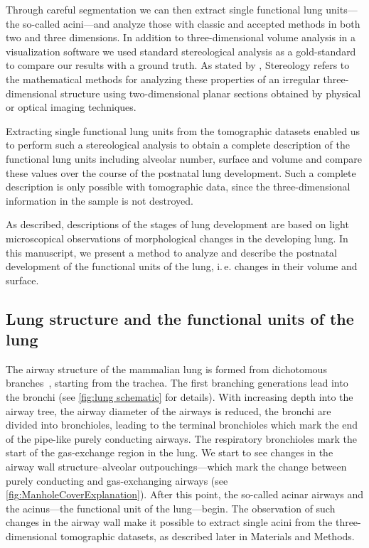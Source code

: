 \documentclass[%
	paper=a4,%
	abstract=true,%
	]{scrartcl}
\newcommand{\ie}{i.\,e.\xspace}
\begin{document}
Through careful segmentation we can then extract single functional lung units---the so-called acini---and analyze those with classic and accepted methods in both two and three dimensions. In addition to three-dimensional volume analysis in a visualization software we used standard stereological analysis \cite{Hsia2010} as a gold-standard to compare our results with a ground truth. As stated by \citet{Hsia2010}, Stereology refers to the mathematical methods for analyzing these properties of an irregular three-dimensional structure using two-dimensional planar sections obtained by physical or optical imaging techniques.

Extracting single functional lung units from the tomographic datasets enabled us to perform such a stereological analysis to obtain a complete description of the functional lung units including alveolar number, surface and volume and compare these values over the course of the postnatal lung development. Such a complete description is only possible with tomographic data, since the three-dimensional information in the sample is not destroyed.

As \citet{Schittny2007a} described, descriptions of the stages of lung development are based on light microscopical observations of morphological changes in the developing lung. In this manuscript, we present a method to analyze and describe the postnatal development of the functional units of the lung, \ie changes in their volume and surface.

\subsection{Lung structure and the functional units of the lung}
The airway structure of the mammalian lung is formed from dichotomous branches~\cite{Weibel1991}, starting from the trachea. The first branching generations lead into the bronchi (see \autoref{fig:lung schematic} for details). With increasing depth into the airway tree, the airway diameter of the airways is reduced, the bronchi are divided into bronchioles, leading to the terminal bronchioles which mark the end of the pipe-like purely conducting airways. The respiratory bronchioles mark the start of the gas-exchange region in the lung. We start to see changes in the airway wall structure--alveolar outpouchings---which mark the change between purely conducting and gas-exchanging airways (see \autoref{fig:ManholeCoverExplanation}). After this point, the so-called acinar airways and the acinus---the functional unit of the lung---begin. The observation of such changes in the airway wall make it possible to extract single acini from the three-dimensional tomographic datasets, as described later in Materials and Methods.
\end{document}
